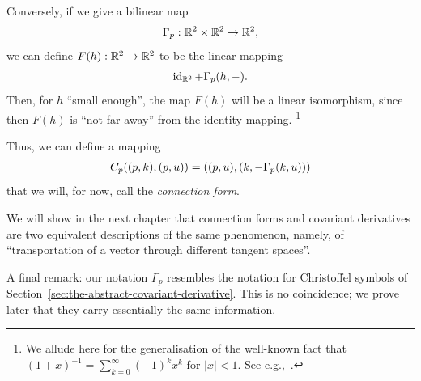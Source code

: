 \documentclass[11pt,a4paper,twoside,openany]{report}
\theoremstyle{my-theorem}
\theoremstyle{non-theorem}
\begin{document}
			Conversely, if we give a bilinear map
			\begin{align*}
				\Gamma_p: {\mathbb R}^2 \times {\mathbb R}^2 \to {\mathbb R}^2,
			\end{align*}
			we can define $F(h): {\mathbb R}^2 \to {\mathbb R}^2$ to be the linear mapping
			\begin{align*}
				\operatorname{id}_{{\mathbb R}^2} + \Gamma_p(h,-).
			\end{align*}
			Then, for $h$ ``small enough'', the map $F(h)$ will be a linear isomorphism, since then $F(h)$ is ``not far away'' from the identity mapping.%
			\footnote{We allude here for the generalisation of the well-known fact that $(1+x)^{-1} = \sum_{k=0}^\infty (-1)^kx^k$ for $|x| < 1$. See e.g.,~\cite{cartan:differential-calculus}.}
			
			Thus, we can define a mapping
			\begin{align*}
				\index{connection form}
				C_p((p,k),(p,u)) = ((p,u),(k,-\Gamma_p(k,u)))
			\end{align*}
			that we will, for now, call the \emph{connection form}.
			
			We will show in the next chapter that connection forms and covariant derivatives are two equivalent descriptions of the same phenomenon, namely, of ``transportation of a vector through different tangent spaces''.
			
			A final remark: our notation $\Gamma_p$ resembles the notation for Christoffel symbols of Section~\ref{sec:the-abstract-covariant-derivative}. This is no coincidence; we prove later that they carry essentially the same information.
			
\end{document}
